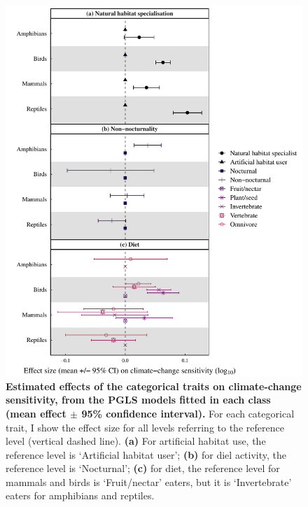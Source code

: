 \begin{figure}[h!]
\centering
\includegraphics[scale=0.75]{figures/Chapter4/Figure5_V2}
\caption[Estimated effects of the categorical traits on climate-change sensitivity, from the PGLS models fitted in each class.]{\textbf{Estimated effects of the categorical traits on climate-change sensitivity, from the PGLS models fitted in each class (mean effect $\pm$ 95\% confidence interval).} For each categorical trait, I show the effect size for all levels referring to the reference level (vertical dashed line). \textbf{(a)} For artificial habitat use, the reference level is `Artificial habitat user'; \textbf{(b)} for diel activity, the reference level is `Nocturnal'; \textbf{(c)} for diet, the reference level for mammals and birds is `Fruit/nectar' eaters, but it is `Invertebrate' eaters for amphibians and reptiles. }
\label{chap4_fig5}
\end{figure}


